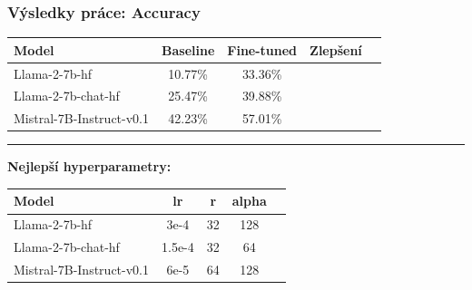\begin{frame}
    \frametitle{Výsledky práce: Accuracy}

    \begin{table}
      \centering
      \renewcommand{\arraystretch}{1.3}
      \begin{tabular}{lcccc}
        \toprule
        \textbf{Model} & \textbf{Baseline} & \textbf{Fine-tuned} & \textbf{Zlepšení} \\
        \midrule
        Llama-2-7b-hf            & 10.77\% & 33.36\% & \cellcolor{green!20}{+22.6\%} \\
        Llama-2-7b-chat-hf       & 25.47\% & 39.88\% & \cellcolor{green!20}{+14.4\%} \\
        Mistral-7B-Instruct-v0.1 & 42.23\% & 57.01\% & \cellcolor{green!20}{+14.8\%} \\
        \bottomrule
      \end{tabular}
    \end{table}

    \vspace{0.3cm}
    \hrule
    \vspace{0.3cm}

    {\small\textbf{Nejlepší hyperparametry:}}

    \vspace{0.2cm}

    \begin{table}
      \centering
      \small
      \renewcommand{\arraystretch}{1.2}
      \begin{tabular}{lcccc}
    \toprule
    \textbf{Model} & \textbf{lr} & \textbf{r} & \textbf{alpha} \\
    \midrule
    Llama-2-7b-hf            & 3e-4   & 32 & 128 \\
    Llama-2-7b-chat-hf       & 1.5e-4 & 32 & 64  \\
    Mistral-7B-Instruct-v0.1 & 6e-5   & 64 & 128 \\
    \bottomrule
  \end{tabular}
    \end{table}

  \end{frame}

